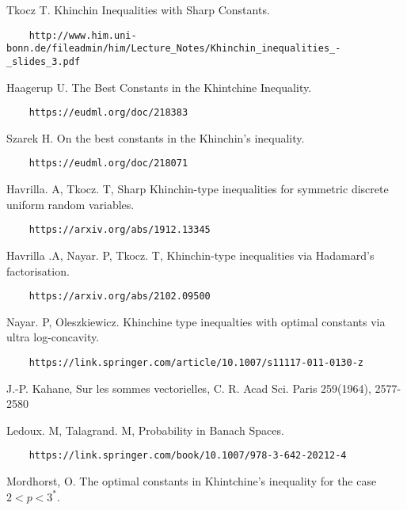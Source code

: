 \documentclass[10pt]{article}
\newcommand{\1}{\textbf{1}}
\theoremstyle{remark}
\theoremstyle{definition}
\begin{document}
\begin{thebibliography}{9}

 Tkocz T. Khinchin Inequalities with Sharp Constants. 

\begin{verbatim}
	http://www.him.uni-bonn.de/fileadmin/him/Lecture_Notes/Khinchin_inequalities_-_slides_3.pdf
\end{verbatim}

 Haagerup U. The Best Constants in the Khintchine Inequality. 

\begin{verbatim}
	https://eudml.org/doc/218383
\end{verbatim}

 Szarek H. On the best constants in the Khinchin's inequality. 

\begin{verbatim}
	https://eudml.org/doc/218071
\end{verbatim}

 Havrilla. A, Tkocz. T, Sharp Khinchin-type inequalities for symmetric discrete uniform random variables. 

\begin{verbatim}
	https://arxiv.org/abs/1912.13345
\end{verbatim}

 Havrilla .A, Nayar. P, Tkocz. T, Khinchin-type inequalities via Hadamard's factorisation. 

\begin{verbatim}
	https://arxiv.org/abs/2102.09500
\end{verbatim}

 Nayar. P, Oleszkiewicz. Khinchine type inequalties with optimal constants via ultra log-concavity. 

\begin{verbatim}
	https://link.springer.com/article/10.1007/s11117-011-0130-z
\end{verbatim}

 J.-P. Kahane, Sur les sommes vectorielles, C. R. Acad Sci. Paris 259(1964), 2577-2580

 Ledoux. M, Talagrand. M, Probability in Banach Spaces. 

\begin{verbatim}
	https://link.springer.com/book/10.1007/978-3-642-20212-4
\end{verbatim}

 Mordhorst, O. The optimal constants in Khintchine's inequality for the case $2 < p < 3^*$. 


\end{thebibliography}
\end{document}
